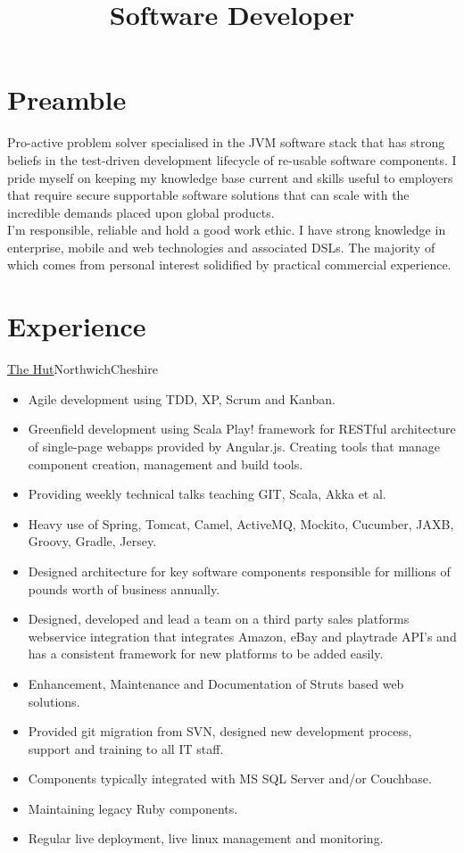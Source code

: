 \documentclass[a4paper,10pt]{moderncv}
\title{Software Developer}
\newcommand\weblink[2] {{\color{href} \href{#1}{#2}}}
\begin{document}
\maketitle

\section{Preamble}
Pro-active problem solver specialised in the JVM software stack that has strong beliefs in the test-driven development lifecycle of re-usable software components.
I pride myself on keeping my knowledge base current and skills useful to employers that require secure supportable software solutions that can scale with the incredible demands placed upon global products.\\

I'm responsible, reliable and hold a good work ethic.
I have strong knowledge in enterprise, mobile and web technologies and associated DSLs. The majority of which comes from personal interest solidified by practical commercial experience.

\section{Experience}

{\weblink{http://www.thehutgroup.com}{The Hut}}{Northwich}{Cheshire}{
\begin{itemize}
  \item Agile development using TDD, XP, Scrum and Kanban.
  \item Greenfield development using Scala Play! framework for RESTful architecture of single-page webapps provided by Angular.js. Creating tools that manage component creation, management and build tools.
  \item Providing weekly technical talks teaching GIT, Scala, Akka et al.
  \item Heavy use of Spring, Tomcat, Camel, ActiveMQ, Mockito, Cucumber, JAXB, Groovy, Gradle, Jersey.
  \item Designed architecture for key software components responsible for millions of pounds worth of business annually.
  \item Designed, developed and lead a team on a third party sales platforms webservice integration that integrates Amazon, eBay and playtrade API's and has a consistent framework for new platforms to be added easily.
  \item Enhancement, Maintenance and Documentation of Struts based web solutions.
  \item Provided git migration from SVN, designed new development process, support and training to all IT staff.
  \item Components typically integrated with MS SQL Server and/or Couchbase.
  \item Maintaining legacy Ruby components.
  \item Regular live deployment, live linux management and monitoring.
\end{itemize}
}
\end{document}
